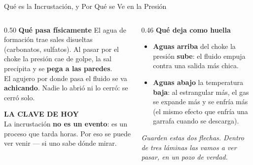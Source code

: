 \documentclass[aspectratio=169, 11pt]{beamer}
\begin{document}
\begin{frame}[shrink=8]{Qué es la Incrustación, y Por Qué se Ve en la Presión}
  \vspace{-4pt}
  \begin{columns}[T]
    \begin{column}{0.50\textwidth}
      {\small\color{arcaDark}\bfseries\faQuestion\hspace{5pt}Qué pasa físicamente}
      \vspace{4pt}
      {\footnotesize\color{textMuted}
      El agua de formación trae sales disueltas (carbonatos, sulfatos).
      Al pasar por el choke la presión cae de golpe, la sal precipita
      y se \textbf{pega a las paredes}.\\[5pt]
      El agujero por donde pasa el fluido se va \textbf{achicando}.
      Nadie lo abrió ni lo cerró: se cerró solo.}
      \vspace{7pt}
      \begin{tcolorbox}[colback=arcaGray, colframe=arcaRed, boxrule=0pt, leftrule=3pt,
        arc=3pt, left=6pt, right=6pt, top=5pt, bottom=5pt]
        {\scriptsize\color{arcaRed}\bfseries\faLightbulb[regular]\hspace{4pt}LA CLAVE DE HOY}\\[4pt]
        {\scriptsize\color{textMuted}
         La incrustación \textbf{no es un evento}: es un proceso que tarda
         horas. Por eso se puede ver venir --- si uno sabe dónde mirar.}
      \end{tcolorbox}
    \end{column}
    \begin{column}{0.46\textwidth}
      {\small\color{arcaDark}\bfseries\faEye\hspace{5pt}Qué deja como huella}
      \vspace{4pt}
      {\footnotesize\color{textMuted}
      \begin{itemize}\setlength{\itemsep}{6pt}
        \item[{\color{arcaRed}\scriptsize\faArrowUp}]
          \textbf{Aguas arriba} del choke la presión \textbf{sube}:
          el fluido empuja contra una salida más chica.
        \item[{\color{codeBlue}\scriptsize\faArrowDown}]
          \textbf{Aguas abajo} la temperatura \textbf{baja}: al estrangular más,
          el gas se expande más y se enfría más
          (el mismo efecto que enfría una garrafa cuando se descarga).
      \end{itemize}}
      \vspace{6pt}
      {\scriptsize\color{arcaDark}\itshape
        Guarden estas dos flechas. Dentro de tres láminas las vamos a ver
        pasar, en un pozo de verdad.}
    \end{column}
  \end{columns}
\end{frame}
\end{document}
